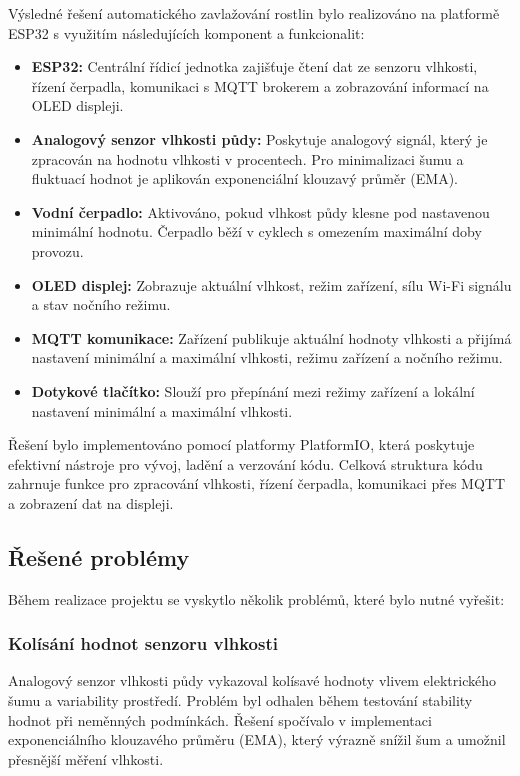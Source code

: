 \documentclass[a4paper, 11pt]{article}
\begin{document}
Výsledné řešení automatického zavlažování rostlin bylo realizováno na platformě ESP32 s využitím následujících komponent a funkcionalit:
\begin{itemize}
    \item \textbf{ESP32:} Centrální řídicí jednotka zajišťuje čtení dat ze senzoru vlhkosti, řízení čerpadla, komunikaci s MQTT brokerem a zobrazování informací na OLED displeji.
    \item \textbf{Analogový senzor vlhkosti půdy:} Poskytuje analogový signál, který je zpracován na hodnotu vlhkosti v procentech. Pro minimalizaci šumu a fluktuací hodnot je aplikován exponenciální klouzavý průměr (EMA).
    \item \textbf{Vodní čerpadlo:} Aktivováno, pokud vlhkost půdy klesne pod nastavenou minimální hodnotu. Čerpadlo běží v cyklech s omezením maximální doby provozu.
    \item \textbf{OLED displej:} Zobrazuje aktuální vlhkost, režim zařízení, sílu Wi-Fi signálu a stav nočního režimu.
    \item \textbf{MQTT komunikace:} Zařízení publikuje aktuální hodnoty vlhkosti a přijímá nastavení minimální a maximální vlhkosti, režimu zařízení a nočního režimu.
    \item \textbf{Dotykové tlačítko:} Slouží pro přepínání mezi režimy zařízení a lokální nastavení minimální a maximální vlhkosti.
\end{itemize}

Řešení bylo implementováno pomocí platformy PlatformIO, která poskytuje efektivní nástroje pro vývoj, ladění a verzování kódu. 
Celková struktura kódu zahrnuje funkce pro zpracování vlhkosti, řízení čerpadla, komunikaci přes MQTT a zobrazení dat na displeji.

\subsection{Řešené problémy}

Během realizace projektu se vyskytlo několik problémů, které bylo nutné vyřešit:

\subsubsection{Kolísání hodnot senzoru vlhkosti}
Analogový senzor vlhkosti půdy vykazoval kolísavé hodnoty vlivem elektrického šumu a variability prostředí. 
Problém byl odhalen během testování stability hodnot při neměnných podmínkách. Řešení spočívalo v implementaci exponenciálního klouzavého průměru (EMA), 
který výrazně snížil šum a umožnil přesnější měření vlhkosti.
\end{document}
